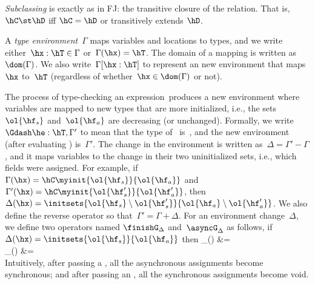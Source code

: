 \documentclass[a4paper]{article}
\begin{document}


\emph{Subclassing} is exactly as in FJ:
    the transitive closure of the \hextends relation.
That is, $\hC \st \hD$ iff $\hC=\hD$ or \hC transitively extends $\hD$.

A \emph{type environment}~$\Gamma$ maps variables and locations to types,
    and we write either~$\hx:\hT \in \Gamma$ or~$\Gamma(\hx)=\hT$.
The domain of a mapping is written as~$\dom(\Gamma)$.
We also write~$\Gamma[\hx:\hT]$ to represent an new environment that maps~$\hx$ to~$\hT$
    (regardless of whether~$\hx \in \dom(\Gamma)$ or not).

The process of type-checking an expression~\he produces a new environment
    where variables are mapped to new types that are more initialized,
    i.e., the sets~$\ol{\hf_s}$ and~$\ol{\hf_a}$ are decreasing (or unchanged).
Formally, we write~$\Gdash \he : \hT, \Gamma'$ to mean that the type of~\he
    is~\hT, and the new environment (after evaluating \he) is~$\Gamma'$.
The change in the environment is written as~$\Delta = \Gamma' - \Gamma$,
    and it maps variables to the change in their two uninitialized sets,
    i.e., which fields were assigned.
For example, if~$\Gamma(\hx)=\hC\myinit{\ol{\hf_s}}{\ol{\hf_a}}$
    and~$\Gamma'(\hx)=\hC\myinit{\ol{\hf'_s}}{\ol{\hf'_a}}$,
    then~$\Delta(\hx)=\initsets{\ol{\hf_s} \setminus \ol{\hf'_s}}{\ol{\hf_a} \setminus \ol{\hf'_a}}$.
We also define the reverse operator so that~$\Gamma' = \Gamma + \Delta$.
For an environment change~$\Delta$, we define two operators named
    $\finishG_\Delta$ and~$\asyncG_\Delta$ as follows,
    if~$\Delta(\hx)=\initsets{\ol{\hf_s}}{\ol{\hf_a}}$ then
\beqst
    \finishG_\Delta(\hx) &=  \\
    \asyncG_\Delta(\hx) &=  \\
\eeq
Intuitively, after passing a \finish, all the asynchronous assignments become synchronous;
    and after passing an \async, all the synchronous assignments become void.
\end{document}

